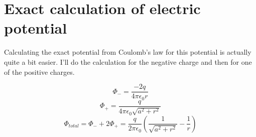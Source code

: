 \documentclass[10pt,a4paper]{article}
\begin{document}
\section{Exact calculation of electric potential}
Calculating the exact potential from Coulomb's law for this potential is actually quite a bit easier.  I'll do the calculation for the negative charge and then for one of the positive charges.

\begin{equation}
\Phi_-=\frac{-2q}{4\pi\epsilon_0r}
\end{equation}
\begin{equation}
\Phi_+=\frac{q}{4\pi\epsilon_0\sqrt{a^2+r^2}}
\end{equation}
\begin{equation}
\Phi_{total}=\Phi_- + 2 \Phi_+ = \frac{q}{2 \pi \epsilon_0} \left( \frac{1}{\sqrt{a^2+r^2}}-\frac{1}{r}\right)
\end{equation}
\end{document}
